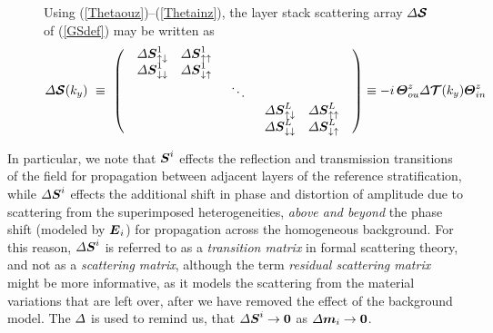 \begin{figure}
{\begin{minipage} {140.0mm}
Using (\ref{Thetaouz})--(\ref{Thetainz}),
 the layer stack scattering array ${\mit \Delta} {\mbox{\boldmath$\cal S$\unboldmath}}$ of 
 (\ref{GSdef}) may be 
written  as
\begin{equation} \label{GSdef1}
{\mit \Delta}{\mbox{\boldmath$\cal S$\unboldmath}}(k_y) \ \equiv\ \left({\begin{array}{ccc}
\begin{array}{cc}{\mit \Delta}{\mbox{\boldmath$\mit S$\unboldmath}}_{\uparrow
\downarrow }^{1}&{\mit \Delta}{\mbox{\boldmath$\mit S$\unboldmath}}_{\uparrow \uparrow }^{1}\\ 
{\mit \Delta}{\mbox{\boldmath$\mit S$\unboldmath}}_{\downarrow\downarrow }^{1}&{\mit \Delta}{\mbox{\boldmath$\mit S$\unboldmath}}_{\downarrow \uparrow }^{1}
\end{array}&&\\ 
& \ddots &\\  
&&\begin{array}{cc}{\mit \Delta}{\mbox{\boldmath$\mit S$\unboldmath}}_{\uparrow \downarrow}^{L}&
{\mit \Delta}{\mbox{\boldmath$\mit S$\unboldmath}}_{\uparrow \uparrow }^{L}\\ 
{\mit \Delta}{\mbox{\boldmath$\mit S$\unboldmath}}_{\downarrow \downarrow }^{L}
&{\mit \Delta}{\mbox{\boldmath$\mit S$\unboldmath}}_{\downarrow \uparrow }^{L}\end{array}
\end{array}}\right)
\equiv -i\, {\mbox{\boldmath$\mit \Theta$\unboldmath}}^{z}_{ou} {\mit \Delta}{\mbox{\boldmath$\cal T$\unboldmath}}(k_y) {\mbox{\boldmath$\mit \Theta$\unboldmath}}^{z}_{in}
\end{equation}

\vspace{6mm}
\end{minipage}
}
\end{figure}

In particular, we note that
${ \mbox{\boldmath$\mit S$\unboldmath}}^{i}$ effects the reflection and transmission transitions of 
the field for propagation between adjacent layers of the reference 
stratification, while 
 ${{\mit \Delta} 
\mbox{\boldmath$\mit S$\unboldmath}}^{i}$ effects the additional shift in phase and distortion of amplitude
due to scattering from the superimposed heterogeneities, 
{\em above and beyond\/} the phase shift (modeled by ${\mbox{\boldmath$\mit E$\unboldmath}}_i$) for 
propagation across the homogeneous background. For this reason, ${{\mit \Delta} 
\mbox{\boldmath$\mit S$\unboldmath}}^{i}$ is referred to as a {\em transition matrix\/} in formal 
scattering theory, and not as a {\em scattering matrix\/}, although the 
term {\em residual scattering matrix\/} might be more informative, as it 
models the scattering from the material variations that are left over, 
after we have removed the effect of the background model. 
The ${\mit \Delta}$ is used to remind us, that ${\mit \Delta}{\mbox{\boldmath$\mit S$\unboldmath}}^i\rightarrow{\bf 0}$ 
as ${\mit \Delta}{\mbox{\boldmath$\mit m$\unboldmath}}_i\rightarrow{\bf 0}$.


